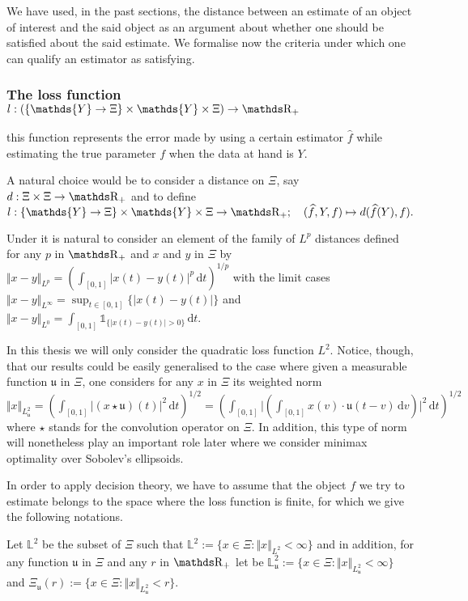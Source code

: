 \medskip

We have used, in the past sections, the distance between an estimate of an object of interest and the said object as an argument about whether one should be satisfied about the said estimate.
We formalise now the criteria under which one can qualify an estimator as satisfying.

\subsubsection{The loss function $l: (\{\mathds{Y} \rightarrow \Xi\} \times \mathds{Y} \times \Xi) \rightarrow \R_{+}$}\label{INTRO_FREQ_DECISION_LOSSFUNCION}
this function represents the error made by using a certain estimator $\widehat{f}$ while estimating the true parameter $f$ when the data at hand is $Y$.

A natural choice would be to consider a distance on $\Xi$, say $d: \Xi \times \Xi \rightarrow \R_{+}$ and to define $l : \{\mathds{Y} \rightarrow \Xi\} \times \mathds{Y} \times \Xi \rightarrow \R_{+}; \quad (\widehat{f}, Y, f) \mapsto d(\widehat{f}(Y), f).$

\medskip

Under  it is natural to consider an element of the family of $L^{p}$ distances defined for any $p$ in $\R_{+}$ and $x$ and $y$ in $\Xi$ by $\Vert x - y \Vert_{L^{p}} = (\int_{[0, 1]} \vert x(t) - y(t) \vert^{p} \, \text{d}t)^{1/p}$ with the limit cases $\Vert x - y \Vert_{L^{\infty}} = \sup_{t \in [0, 1]} \{ \vert x(t) - y(t) \vert \}$ and $\Vert x - y\Vert_{L^{0}} = \int_{[0, 1]} \mathds{1}_{\{ \vert x(t) - y(t) \vert > 0\}} \, \text{d}t$.

In this thesis we will only consider the quadratic loss function $L^{2}$.
Notice, though, that our results could be easily generalised to the case where given a measurable function $\mathfrak{u}$ in $\Xi$, one considers for any $x$ in $\Xi$ its weighted norm $\Vert x \Vert_{L^{2}_{\mathfrak{u}}} = (\int_{[0, 1]} \vert (x \star \mathfrak{u})(t)\vert^{2} \, \text{d}t)^{1/2} = (\int_{[0, 1]} \vert (\int_{[0, 1]} x(v) \cdot \mathfrak{u}(t - v) \, \text{d}v)\vert^{2} \, \text{d}t)^{1/2}$ where $\star$ stands for the convolution operator on $\Xi$.
In addition, this type of norm will nonetheless play an important role later where we consider minimax optimality over Sobolev's ellipsoids.

\medskip

In order to apply decision theory, we have to assume that the object $f$ we try to estimate belongs to the space where the loss function is finite, for which we give the following notations.
\begin{de}\label{DE_INTRO_FREQ_SPACELXI}
Let $\mathds{L}^{2}$ be the subset of $\Xi$ such that $\mathds{L}^{2} := \{x \in \Xi: \Vert x \Vert_{L^{2}} < \infty\}$ and in addition, for any function $\mathfrak{u}$ in $\Xi$ and any $r$ in $\R_{+}$ let be $\mathds{L}_{\mathfrak{u}}^{2} := \{x \in \Xi: \Vert x \Vert_{L_{\mathfrak{u}}^{2}} < \infty\}$ and $\Xi_{\mathfrak{u}}(r) := \{ x \in \Xi: \Vert x \Vert_{L^{2}_{\mathfrak{u}}} < r\}$.
\assEnd
\end{de}


